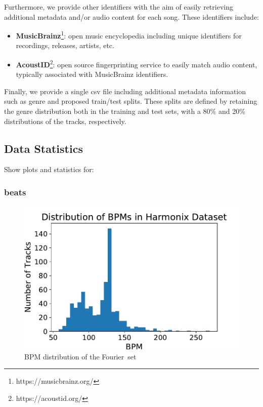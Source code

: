 \documentclass{article}
\newcommand{\setName}{Fourier}
\begin{document}
Furthermore, we provide other identifiers with the aim of easily retrieving additional metadata and/or audio content for each song.
These identifiers include:

\begin{itemize}
    \item \textbf{MusicBrainz}\footnote{https://musicbrainz.org/}: open music encyclopedia including unique identifiers for recordings, releases, artists, etc. 
    \item \textbf{AcoustID}\footnote{https://acoustid.org/}: open source fingerprinting service to easily match audio content, typically associated with MusicBrainz identifiers.
\end{itemize}

Finally, we provide a single csv file including additional metadata information such as genre and proposed train/test splits.
These splits are defined by retaining the genre distribution both in the training and test sets, with a 80\% and 20\% distributions of the tracks, respectively.

\subsection{Data Statistics}

Show plots and statistics for: 

\subsubsection{beats}

\begin{figure}
    \centerline{\includegraphics[width=\columnwidth]{figs/BPM_distribution.pdf}}
    \caption{BPM distribution of the \setName~set}
    \label{fig:BPM_dist}
\end{figure}
\end{document}
